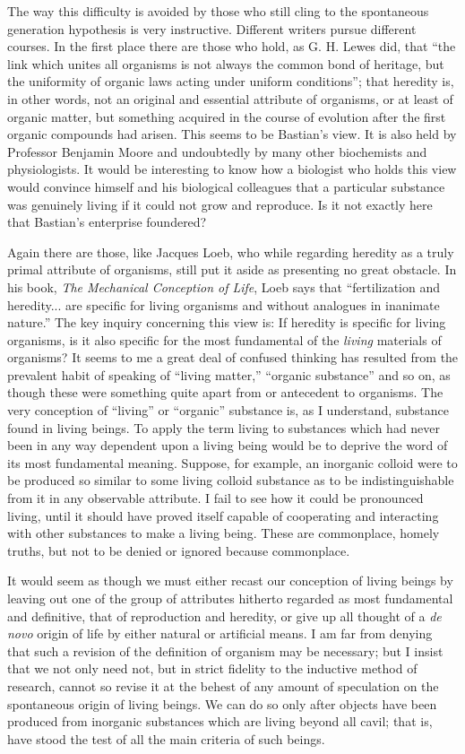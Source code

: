 \documentclass[a4paper, 11pt, oneside, polutonikogreek, english, landscape]{article}
\begin{document}
The way this difficulty is avoided by those who still cling to the spontaneous generation hypothesis is very instructive. Different writers pursue different courses. In the first place there are those who hold, as G. H. Lewes did, that ``the link which unites all organisms is not always the common bond of heritage, but the uniformity of organic laws acting under uniform conditions''; that heredity is, in other words, not an original and essential attribute of organisms, or at least of organic matter, but something acquired in the course of evolution after the first organic compounds had arisen. This seems to be Bastian's view. It is also held by Professor Benjamin Moore and undoubtedly by many other biochemists and physiologists. It would be interesting to know how a biologist who holds this view would convince himself and his biological colleagues that a particular substance was genuinely living if it could not grow and reproduce. Is it not exactly here that Bastian's enterprise foundered?

Again there are those, like Jacques Loeb, who while regarding heredity as a truly primal attribute of organisms, still put it aside as presenting no great obstacle. In his book, \emph{The Mechanical Conception of Life}, Loeb says that ``fertilization and heredity... are specific for living organisms and without analogues in inanimate nature.'' The key inquiry concerning this view is: If heredity is specific for living organisms, is it also specific for the most fundamental of the \emph{living} materials of organisms? It seems to me a great deal of confused thinking has resulted from the prevalent habit of speaking of ``living matter,'' ``organic substance'' and so on, as though these were something quite apart from or antecedent to organisms. The very conception of ``living'' or ``organic'' substance is, as I understand, substance found in living beings. To apply the term living to substances which had never been in any way dependent upon a living being would be to deprive the word of its most fundamental meaning. Suppose, for example, an inorganic colloid were to be produced so similar to some living colloid substance as to be indistinguishable from it in any observable attribute. I fail to see how it could be pronounced living, until it should have proved itself capable of cooperating and interacting with other substances to make a living being. These are commonplace, homely truths, but not to be denied or ignored because commonplace.

It would seem as though we must either recast our conception of living beings by leaving out one of the group of attributes hitherto regarded as most fundamental and definitive, that of reproduction and heredity, or give up all thought of a \emph{de novo} origin of life by either natural or artificial means. I am far from denying that such a revision of the definition of organism may be necessary; but I insist that we not only need not, but in strict fidelity to the inductive method of research, cannot so revise it at the behest of any amount of speculation on the spontaneous origin of living beings. We can do so only after objects have been produced from inorganic substances which are living beyond all cavil; that is, have stood the test of all the main criteria of such beings.
\end{document}
